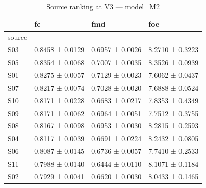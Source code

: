 \begin{table}[htbp]
\centering
\caption{Source ranking at V3 — model=M2}
\label{tab:rank:M2}
\begin{tabular}{llll}
\toprule
\toprule
 & fc & fmd & foe \\
\midrule
source &  &  &  \\
\midrule
S03 & 0.8458 ± 0.0129 & 0.6957 ± 0.0026 & 8.2710 ± 0.3223 \\
S05 & 0.8354 ± 0.0068 & 0.7007 ± 0.0035 & 8.3526 ± 0.0939 \\
S01 & 0.8275 ± 0.0057 & 0.7129 ± 0.0023 & 7.6062 ± 0.0437 \\
S07 & 0.8217 ± 0.0074 & 0.7028 ± 0.0020 & 7.6888 ± 0.0524 \\
S10 & 0.8171 ± 0.0228 & 0.6683 ± 0.0217 & 7.8353 ± 0.4349 \\
S09 & 0.8171 ± 0.0062 & 0.6964 ± 0.0051 & 7.7512 ± 0.3755 \\
S08 & 0.8167 ± 0.0098 & 0.6953 ± 0.0030 & 8.2815 ± 0.2593 \\
S04 & 0.8117 ± 0.0039 & 0.6691 ± 0.0224 & 8.2432 ± 0.0805 \\
S06 & 0.8087 ± 0.0145 & 0.6736 ± 0.0057 & 7.7410 ± 0.2533 \\
S11 & 0.7988 ± 0.0140 & 0.6444 ± 0.0110 & 8.1071 ± 0.1184 \\
S02 & 0.7929 ± 0.0041 & 0.6620 ± 0.0030 & 8.0433 ± 0.1465 \\
\bottomrule
\end{tabular}\end{table}
